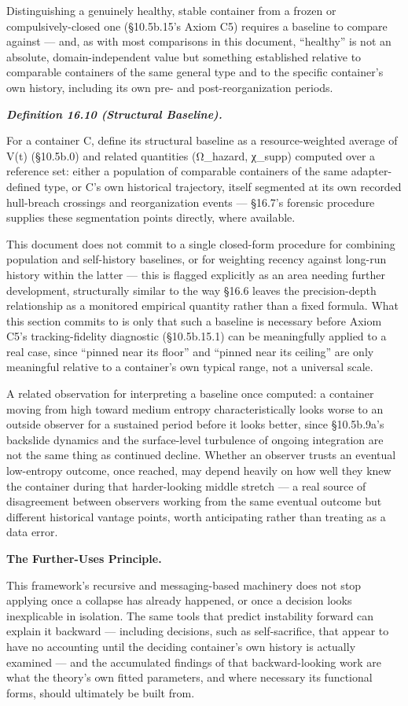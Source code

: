 \documentclass[
]{article}
\begin{document}
Distinguishing a genuinely healthy, stable container from a frozen or
compulsively-closed one (§10.5b.15's Axiom C5) requires a baseline to
compare against --- and, as with most comparisons in this document,
``healthy'' is not an absolute, domain-independent value but something
established relative to comparable containers of the same general type
and to the specific container's own history, including its own pre- and
post-reorganization periods.

\emph{\textbf{Definition 16.10 (Structural Baseline).}}

For a container C, define its structural baseline as a resource-weighted
average of V(t) (§10.5b.0) and related quantities (Ω\_hazard, χ\_supp)
computed over a reference set: either a population of comparable
containers of the same adapter-defined type, or C's own historical
trajectory, itself segmented at its own recorded hull-breach crossings
and reorganization events --- §16.7's forensic procedure supplies these
segmentation points directly, where available.

This document does not commit to a single closed-form procedure for
combining population and self-history baselines, or for weighting
recency against long-run history within the latter --- this is flagged
explicitly as an area needing further development, structurally similar
to the way §16.6 leaves the precision-depth relationship as a monitored
empirical quantity rather than a fixed formula. What this section
commits to is only that such a baseline is necessary before Axiom C5's
tracking-fidelity diagnostic (§10.5b.15.1) can be meaningfully applied
to a real case, since ``pinned near its floor'' and ``pinned near its
ceiling'' are only meaningful relative to a container's own typical
range, not a universal scale.

A related observation for interpreting a baseline once computed: a
container moving from high toward medium entropy characteristically
looks worse to an outside observer for a sustained period before it
looks better, since §10.5b.9a's backslide dynamics and the surface-level
turbulence of ongoing integration are not the same thing as continued
decline. Whether an observer trusts an eventual low-entropy outcome,
once reached, may depend heavily on how well they knew the container
during that harder-looking middle stretch --- a real source of
disagreement between observers working from the same eventual outcome
but different historical vantage points, worth anticipating rather than
treating as a data error.

\textbf{The Further-Uses Principle.}

This framework's recursive and messaging-based machinery does not stop
applying once a collapse has already happened, or once a decision looks
inexplicable in isolation. The same tools that predict instability
forward can explain it backward --- including decisions, such as
self-sacrifice, that appear to have no accounting until the deciding
container's own history is actually examined --- and the accumulated
findings of that backward-looking work are what the theory's own fitted
parameters, and where necessary its functional forms, should ultimately
be built from.
\end{document}
